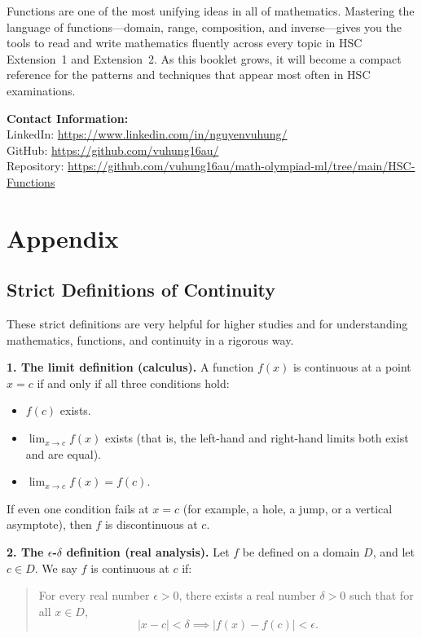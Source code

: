 \documentclass[12pt]{article}
\theoremstyle{definition}
\begin{document}
Functions are one of the most unifying ideas in all of mathematics. Mastering the language of functions---domain, range, composition, and inverse---gives you the tools to read and write mathematics fluently across every topic in HSC Extension~1 and Extension~2. As this booklet grows, it will become a compact reference for the patterns and techniques that appear most often in HSC examinations.

\vspace{2em}
\noindent\textbf{Contact Information:}\\[0.5em]
LinkedIn: \href{https://www.linkedin.com/in/nguyenvuhung/}{https://www.linkedin.com/in/nguyenvuhung/}\\[0.3em]
GitHub: \href{https://github.com/vuhung16au/}{https://github.com/vuhung16au/}\\[0.3em]
Repository: \href{https://github.com/vuhung16au/math-olympiad-ml/tree/main/HSC-Functions}{https://github.com/vuhung16au/math-olympiad-ml/tree/main/HSC-Functions}

\section{Appendix}

\subsection{Strict Definitions of Continuity}

These strict definitions are very helpful for higher studies and for understanding mathematics, functions, and continuity in a rigorous way.

\textbf{1. The limit definition (calculus).} A function $f(x)$ is continuous at a point $x=c$ if and only if all three conditions hold:
\begin{itemize}[leftmargin=*]
  \item $f(c)$ exists.
  \item $\lim_{x\to c}f(x)$ exists (that is, the left-hand and right-hand limits both exist and are equal).
  \item $\lim_{x\to c}f(x)=f(c)$.
\end{itemize}

If even one condition fails at $x=c$ (for example, a hole, a jump, or a vertical asymptote), then $f$ is discontinuous at $c$.

\textbf{2. The $\epsilon$-$\delta$ definition (real analysis).} Let $f$ be defined on a domain $D$, and let $c\in D$. We say $f$ is continuous at $c$ if:
\begin{quote}
For every real number $\epsilon>0$, there exists a real number $\delta>0$ such that for all $x\in D$,
\[
|x-c|<\delta \implies |f(x)-f(c)|<\epsilon.
\]
\end{quote}
\end{document}
